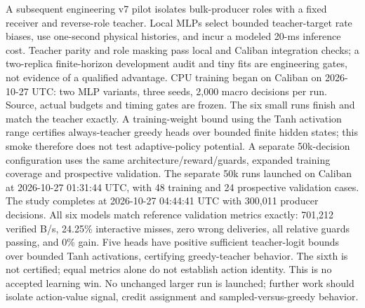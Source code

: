 \documentclass[11pt]{article}
\begin{document}
A subsequent engineering v7 pilot isolates bulk-producer roles with a fixed
receiver and reverse-role teacher. Local MLPs select bounded teacher-target rate
biases, use one-second physical histories, and incur a modeled 20-ms inference
cost. Teacher parity and role masking pass local and Caliban integration checks;
a two-replica finite-horizon development audit and tiny fits are engineering gates,
not evidence of a qualified advantage. CPU training began on Caliban on
2026-10-27 UTC: two MLP variants, three seeds, 2,000 macro decisions per run.
Source, actual budgets and timing gates are frozen. The six small runs finish and match the teacher exactly. A training-weight bound
using the Tanh activation range certifies always-teacher greedy heads over bounded finite hidden states; this smoke therefore does not test adaptive-policy potential.
A separate 50k-decision configuration uses the same architecture/reward/guards,
expanded training coverage and prospective validation. The separate 50k runs launched on Caliban at 2026-10-27 01:31:44 UTC,
with 48 training and 24 prospective validation cases. The study completes at 2026-10-27 04:44:41 UTC with 300,011 producer decisions.
All six models match reference validation metrics exactly: 701,212 verified B/s,
24.25\% interactive misses, zero wrong deliveries, all relative guards passing,
and 0\% gain. Five heads have positive sufficient teacher-logit bounds over
bounded Tanh activations, certifying greedy-teacher behavior. The sixth is not
certified; equal metrics alone do not establish action identity. This is no
accepted learning win. No unchanged larger run is launched; further work should
isolate action-value signal, credit assignment and sampled-versus-greedy behavior.
\end{document}
